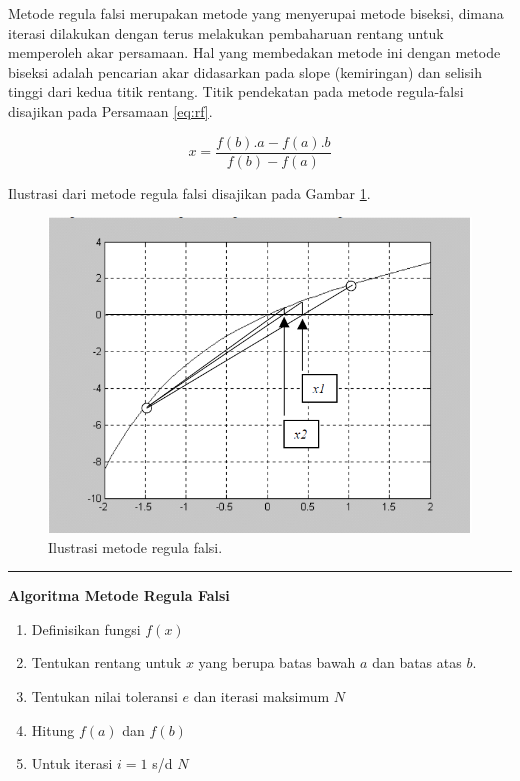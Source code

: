 \documentclass[
]{book}
\providecommand{\tightlist}{%
  \setlength{\itemsep}{0pt}\setlength{\parskip}{0pt}}
\theoremstyle{definition}
\theoremstyle{definition}
\theoremstyle{definition}
\theoremstyle{definition}
\theoremstyle{remark}
\begin{document}
Metode regula falsi merupakan metode yang menyerupai metode biseksi, dimana iterasi dilakukan dengan terus melakukan pembaharuan rentang untuk memperoleh akar persamaan. Hal yang membedakan metode ini dengan metode biseksi adalah pencarian akar didasarkan pada slope (kemiringan) dan selisih tinggi dari kedua titik rentang. Titik pendekatan pada metode regula-falsi disajikan pada Persamaan \eqref{eq:rf}.

\begin{equation}
x=\frac{f\left(b\right).a-f\left(a\right).b}{f\left(b\right)-f\left(a\right)}
  \label{eq:rf}
\end{equation}

Ilustrasi dari metode regula falsi disajikan pada Gambar \ref{fig:regula}.

\begin{figure}

{\centering \includegraphics[width=0.8\linewidth]{./images/regula} 

}

\caption{Ilustrasi metode regula falsi.}\label{fig:regula}
\end{figure}

\begin{center}\rule{0.5\linewidth}{0.5pt}\end{center}

\textbf{Algoritma Metode Regula Falsi}

\begin{enumerate}
\def\labelenumi{\arabic{enumi}.}
\tightlist
\item
  Definisikan fungsi \(f\left(x \right)\)
\item
  Tentukan rentang untuk \(x\) yang berupa batas bawah \(a\) dan batas atas \(b\).
\item
  Tentukan nilai toleransi \(e\) dan iterasi maksimum \(N\)
\item
  Hitung \(f\left(a \right)\) dan \(f\left(b \right)\)
\item
  Untuk iterasi \(i=1\) s/d \(N\)
\end{enumerate}
\end{document}
